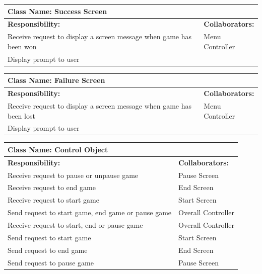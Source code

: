 \documentclass[12pt, titlepage]{article}
\begin{document}
	\begin{table}[H]
		\centering
		\begin{tabular}{|p{10cm}|p{5cm}|}
		\hline 
		 \multicolumn{2}{|l|}{\textbf{Class Name: Success Screen}} \\
		\hline
		\textbf{Responsibility:} & \textbf{Collaborators:} \\
		\hline
		 Receive request to display a screen message when game has been won& Menu Controller \\
		\hline
		 Display prompt to user& \\
		\hline
		\end{tabular}
	\end{table}
	
	\begin{table}[H]
		\centering
		\begin{tabular}{|p{10cm}|p{5cm}|}
		\hline 
		 \multicolumn{2}{|l|}{\textbf{Class Name: Failure Screen}} \\
		\hline
		\textbf{Responsibility:} & \textbf{Collaborators:} \\
		\hline
		 Receive request to display a screen message when game has been lost& Menu Controller \\
		\hline
		 Display prompt to user& \\
		\hline
		\end{tabular}
	\end{table}	
	
	\begin{table}[H]
		\centering
		\begin{tabular}{|p{10cm}|p{5cm}|}
		\hline 
		 \multicolumn{2}{|l|}{\textbf{Class Name: Control Object}} \\
		\hline
		\textbf{Responsibility:} & \textbf{Collaborators:} \\
		\hline
		 Receive request to pause or unpause game & Pause Screen\\
		\hline
		 Receive request to end game & End Screen\\
		\hline
		 Receive request to start game & Start Screen\\
		\hline
		Send request to start game, end game or pause game & Overall Controller\\
		\hline
		Receive request to start, end or pause game & Overall Controller\\
		\hline
		Send request to start game & Start Screen\\
		\hline
		Send request to end game & End Screen\\
		\hline
		Send request to pause game & Pause Screen\\
		\hline
		\end{tabular}
	\end{table}
\end{document}
